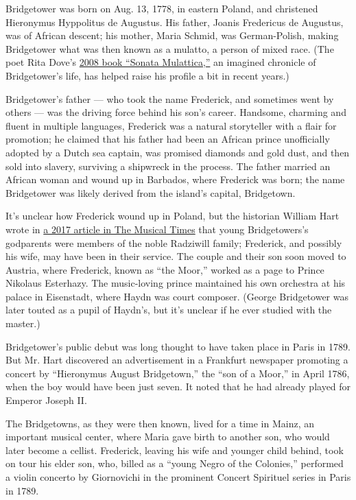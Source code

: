 Bridgetower was born on Aug. 13, 1778, in eastern Poland, and christened
Hieronymus Hyppolitus de Augustus. His father, Joanis Fredericus de
Augustus, was of African descent; his mother, Maria Schmid, was
German-Polish, making Bridgetower what was then known as a mulatto, a
person of mixed race. (The poet Rita Dove's
\href{https://www.nytimes3xbfgragh.onion/2009/04/03/books/03dove.html}{2008
book ``Sonata Mulattica,''} an imagined chronicle of Bridgetower's life,
has helped raise his profile a bit in recent years.)

Bridgetower's father --- who took the name Frederick, and sometimes went
by others --- was the driving force behind his son's career. Handsome,
charming and fluent in multiple languages, Frederick was a natural
storyteller with a flair for promotion; he claimed that his father had
been an African prince unofficially adopted by a Dutch sea captain, was
promised diamonds and gold dust, and then sold into slavery, surviving a
shipwreck in the process. The father married an African woman and wound
up in Barbados, where Frederick was born; the name Bridgetower was
likely derived from the island's capital, Bridgetown.

It's unclear how Frederick wound up in Poland, but the historian William
Hart wrote in
\href{https://www.researchgate.net/publication/319710845_New_Light_on_George_Bridgtower}{a
2017 article in The Musical Times} that young Bridgetowers's godparents
were members of the noble Radziwill family; Frederick, and possibly his
wife, may have been in their service. The couple and their son soon
moved to Austria, where Frederick, known as ``the Moor,'' worked as a
page to Prince Nikolaus Esterhazy. The music-loving prince maintained
his own orchestra at his palace in Eisenstadt, where Haydn was court
composer. (George Bridgetower was later touted as a pupil of Haydn's,
but it's unclear if he ever studied with the master.)

Bridgetower's public debut was long thought to have taken place in Paris
in 1789. But Mr. Hart discovered an advertisement in a Frankfurt
newspaper promoting a concert by ``Hieronymus August Bridgetown,'' the
``son of a Moor,'' in April 1786, when the boy would have been just
seven. It noted that he had already played for Emperor Joseph II.

The Bridgetowns, as they were then known, lived for a time in Mainz, an
important musical center, where Maria gave birth to another son, who
would later become a cellist. Frederick, leaving his wife and younger
child behind, took on tour his elder son, who, billed as a ``young Negro
of the Colonies,'' performed a violin concerto by Giornovichi in the
prominent Concert Spirituel series in Paris in 1789.

